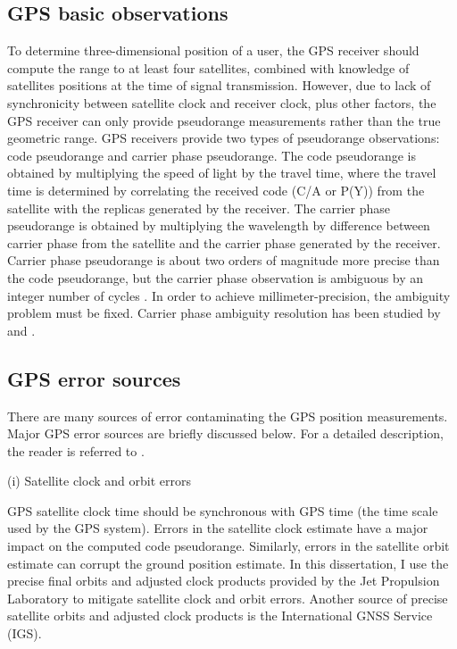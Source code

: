 \subsection{GPS basic observations}
To determine three-dimensional position of a user, the GPS receiver should compute the range to at least four satellites, combined with knowledge of satellites positions at the time of signal transmission.  However, due to lack of synchronicity between satellite clock and receiver clock, plus other factors, the GPS receiver can only provide pseudorange measurements rather than the true geometric range.  GPS receivers provide two types of pseudorange observations: code pseudorange and carrier phase pseudorange.  The code pseudorange is obtained by multiplying the speed of light by the travel time, where the travel time is determined by correlating the received code (C/A or P(Y)) from the satellite with the replicas generated by the receiver.  The carrier phase pseudorange is obtained by multiplying the wavelength by difference between carrier phase from the satellite and the carrier phase generated by the receiver.  Carrier phase pseudorange is about two orders of magnitude more precise than the code pseudorange, but the carrier phase observation is ambiguous by an integer number of cycles \cite[]{remondi1985chpt2}.  In order to achieve millimeter-precision, the ambiguity problem must be fixed.  Carrier phase ambiguity resolution has been studied by \citet{lichten1987chpt2} and \citet{blewitt1989chpt2,blewitt2008chpt2}.  

\subsection{GPS error sources}
There are many sources of error contaminating the GPS position measurements. Major GPS error sources are briefly discussed below.  For a detailed description, the reader is referred to \citet{hofmann2001chpt2}.  

(i) Satellite clock and orbit errors
 
GPS satellite clock time should be synchronous with GPS time (the time scale used by the GPS system).  Errors in the satellite clock estimate have a major impact on the computed code pseudorange.  Similarly, errors in the satellite orbit estimate can corrupt the ground position estimate.  In this dissertation, I use the precise final orbits and adjusted clock products provided by the Jet Propulsion Laboratory to mitigate satellite clock and orbit errors.  Another source of precise satellite orbits and adjusted clock products is the International GNSS Service (IGS). 

